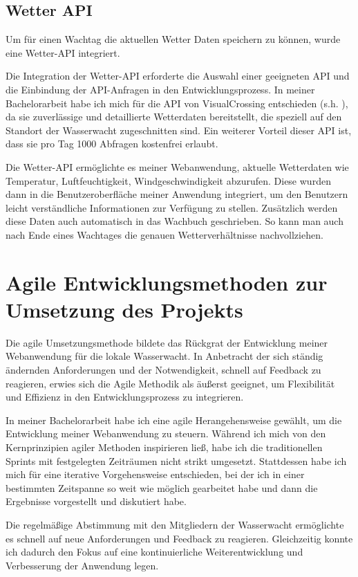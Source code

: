 \documentclass[fontsize=12pt,openright,oneside,paper=a4,BCOR=1cm]{scrbook}
\begin{document}
\subsection{Wetter API}
Um für einen Wachtag die aktuellen Wetter Daten speichern zu können, wurde eine Wetter-API integriert.

Die Integration der Wetter-API erforderte die Auswahl einer geeigneten API und die Einbindung der API-Anfragen in den Entwicklungsprozess. In meiner Bachelorarbeit habe ich mich für die API von VisualCrossing entschieden (s.h. \cite{weatherapi}), da sie zuverlässige und detaillierte Wetterdaten bereitstellt, die speziell auf den Standort der Wasserwacht zugeschnitten sind. Ein weiterer Vorteil dieser API ist, dass sie pro Tag 1000 Abfragen kostenfrei erlaubt.

Die Wetter-API ermöglichte es meiner Webanwendung, aktuelle Wetterdaten wie Temperatur, Luftfeuchtigkeit, Windgeschwindigkeit abzurufen. Diese wurden dann in die Benutzeroberfläche meiner Anwendung integriert, um den Benutzern leicht verständliche Informationen zur Verfügung zu stellen. Zusätzlich werden diese Daten auch automatisch in das Wachbuch geschrieben. So kann man auch nach Ende eines Wachtages die genauen Wetterverhältnisse nachvollziehen.

\section{Agile Entwicklungsmethoden zur Umsetzung des Projekts}

Die agile Umsetzungsmethode bildete das Rückgrat der Entwicklung meiner Webanwendung für die lokale Wasserwacht. In Anbetracht der sich ständig ändernden Anforderungen und der Notwendigkeit, schnell auf Feedback zu reagieren, erwies sich die Agile Methodik als äußerst geeignet, um Flexibilität und Effizienz in den Entwicklungsprozess zu integrieren.

In meiner Bachelorarbeit habe ich eine agile Herangehensweise gewählt, um die Entwicklung meiner Webanwendung zu steuern. Während ich mich von den Kernprinzipien agiler Methoden inspirieren ließ, habe ich die traditionellen Sprints mit festgelegten Zeiträumen nicht strikt umgesetzt. Stattdessen habe ich mich für eine iterative Vorgehensweise entschieden, bei der ich in einer bestimmten Zeitspanne so weit wie möglich gearbeitet habe und dann die Ergebnisse vorgestellt und diskutiert habe. 

Die regelmäßige Abstimmung mit den Mitgliedern der Wasserwacht ermöglichte es schnell auf neue Anforderungen und Feedback zu reagieren. Gleichzeitig konnte ich dadurch den Fokus auf eine kontinuierliche Weiterentwicklung und Verbesserung der Anwendung legen.
\end{document}
